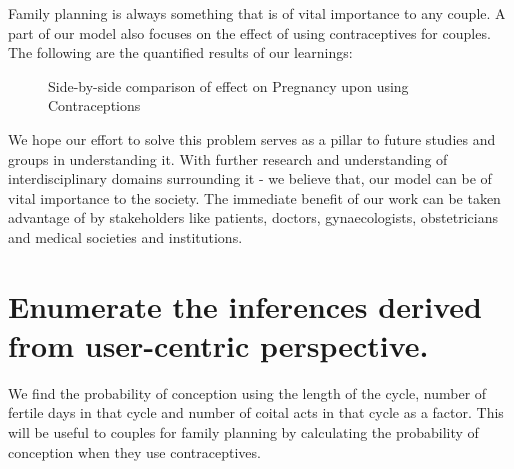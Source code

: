 \documentclass{article}
\begin{document}
Family planning is always something that is of vital importance to any couple. A part of our model also focuses on the effect of using contraceptives for couples. The following are the quantified results of our learnings: \\ 

\begin{figure}[H]%
	\centering
	\qquad
	\caption{Side-by-side comparison of effect on Pregnancy upon using Contraceptions}%
	\label{fig:example}%
\end{figure}

We hope our effort to solve this problem serves as a pillar to future studies and groups in understanding it. With further research and understanding of interdisciplinary domains surrounding it - we believe that, our model can be of vital importance to the society. The immediate benefit of our work can be taken advantage of by stakeholders like patients, doctors, gynaecologists, obstetricians and medical societies and institutions.
\section{Enumerate the inferences derived from user-centric perspective.}
We find the probability of conception using the length of the cycle, number of fertile days in that cycle and number of coital acts in that cycle as a factor. This will be useful to couples for family planning by calculating the probability of conception when they use contraceptives.\\
\end{document}
